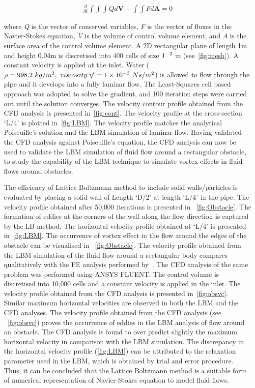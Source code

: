 \begin{align}
\frac{\partial}{\partial t} \int\int\int  Q d\mathbf{V} + \int\int \mathit{F} d\mathbf{A} = 0
\end{align}

where \textit{Q} is the vector of conserved variables, \textit{F} is the vector 
of fluxes in the Navier-Stokes equation, \textit{V} is the volume of control 
volume element, and \textit{A} is the surface area of the control volume 
element. A 2D rectangular plane of length 1m and height 0.04m is discretised 
into 400 cells of size $1 \time 10^{-2} $ m (see~\cref{fig:mesh}). A constant 
velocity is applied at the inlet. Water ($\rho = 998.2\mbox{ }kg/m^{3},\mbox{ } 
viscosity`\eta'=1 \times 10^{-3}\mbox{ } Ns/m^{2} $) is allowed to flow through 
the pipe and it develops into a fully laminar flow. The Least-Squares cell 
based approach was adopted to solve the gradient, and 100 iteration steps were 
carried out until the solution converges. The velocity contour profile obtained 
from the CFD analysis is presented in~\cref{fig:cont}. The velocity profile at 
the cross-section `L/4' is plotted in~\cref{fig:LBM}. The velocity profile 
matches the analytical Poiseuille's solution and the LBM simulation of laminar 
flow. Having validated the CFD analysis against Poiseuille's equation, the CFD 
analysis can now be used to validate the LBM simulation of fluid flow around a 
rectangular obstacle, to study the capability of the LBM technique to simulate 
vortex effects in fluid flows around obstacles.

The efficiency of Lattice Boltzmann method to include solid walls/particles is 
evaluated by placing a solid wall of Length `D/2' at length `L/4' in the pipe. 
The velocity profile obtained after 50,000 iterations is presented in 
~\cref{fig:Obstacle}. The formation of eddies at the corners of the wall along 
the flow direction is captured by the LB method. The horizontal velocity 
profile obtained at `L/4' is presented in~\cref{fig:LBM}. The occurrence of 
vortex effect in the flow around the edges of the obstacle can be visualised in 
~\cref{fig:Obstacle}. The velocity profile obtained from the LBM simulation of 
the fluid flow around a rectangular body compares qualitatively with the FE 
analysis performed by~\citet{Zhong1991}. The CFD analysis of the same problem 
was performed using ANSYS FLUENT. The control volume is discretised into 10,000 
cells and a constant velocity is applied in the inlet. The velocity profile 
obtained from the CFD analysis is presented in~\cref{fig:obsvc}. Similar 
maximum horizontal velocities are observed in both the LBM and the CFD 
analyses. The velocity profile obtained from the CFD analysis (see 
~\cref{fig:obsvc}) proves the occurrence of eddies in the LBM analysis of flow 
around an obstacle. The CFD analysis is found to over predict slightly the 
maximum horizontal velocity in comparison with the LBM simulation. The 
discrepancy in the horizontal velocity profile (\cref{fig:LBM}) can be 
attributed to the relaxation parameter used in the LBM, which is obtained by 
trial and error procedure. Thus, it can be concluded that the Lattice Boltzmann 
method is a suitable form of numerical representation of Navier-Stokes equation 
to model fluid flows. 

